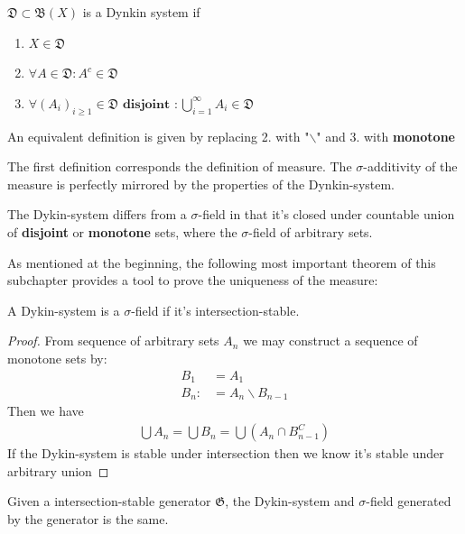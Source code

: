 \begin{definition}
$\mathfrak{D}\subset \mathfrak{B}(X)$ is a Dynkin system if
\begin{enumerate}
	\item $X \in \mathfrak{D}$
	\item $\forall A \in \mathfrak{D}: A^c \in \mathfrak{D}$
	\item $\forall (A_i)_{i \geq 1} \in \mathfrak{D} \textbf{ disjoint }: \bigcup_{i = 1}^\infty A_i \in \mathfrak{D}$
\end{enumerate} 
An equivalent definition is given by replacing 2. with "$\backslash$" and 3. with \textbf{monotone}
\end{definition}
\begin{remark}
The first definition corresponds the definition of measure. The $\sigma$-additivity of the measure is perfectly mirrored by the properties of the Dynkin-system.\par 
The Dykin-system differs from a $\sigma$-field in that it's closed under countable union of \textbf{disjoint} or \textbf{monotone} sets, where the $\sigma$-field of arbitrary sets.\par 
As mentioned at the beginning, the following most important theorem of this subchapter provides a tool to prove the uniqueness of the measure:
\end{remark}

\begin{lemma}
	A Dykin-system is a $\sigma$-field if it's intersection-stable.
\end{lemma}
\begin{proof}
	From sequence of arbitrary sets $A_n$ we may construct a sequence of monotone sets by:
	\begin{align*}
		B_1 &= A_1\\
		B_n: &= A_n \backslash B_{n-1}
	\end{align*}
	Then we have
	\begin{align*}
		\bigcup A_n = \bigcup B_n = \bigcup(A_n \cap B_{n-1}^C)
	\end{align*}
	If the Dykin-system is stable under intersection then we know it's stable under arbitrary union
\end{proof}

\begin{theorem}
	Given a intersection-stable generator $\mathfrak{G}$, the Dykin-system and $\sigma$-field generated by the generator is the same.
\end{theorem}







